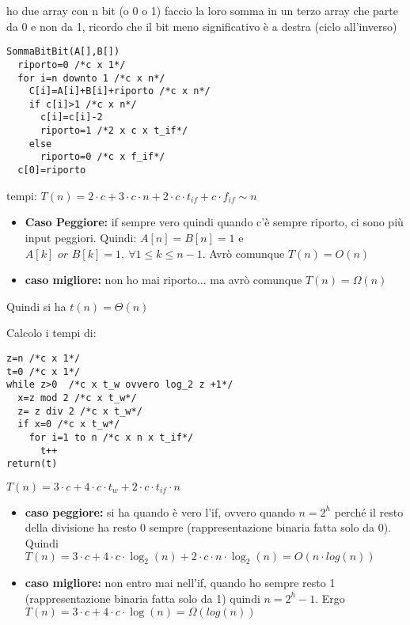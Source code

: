 \documentclass[a4paper,12pt,oneside,tikz]{book}
\begin{document}
\begin{esercizio}
ho due array con n bit (o 0 o 1) faccio la loro somma in un terzo array
che parte da 0 e non da 1, ricordo che il bit meno significativo è a  destra (ciclo all'inverso)
\begin{verbatim}
SommaBitBit(A[],B[])
  riporto=0 /*c x 1*/
  for i=n downto 1 /*c x n*/
    C[i]=A[i]+B[i]+riporto /*c x n*/
    if c[i]>1 /*c x n*/ 
      c[i]=c[i]-2
      riporto=1 /*2 x c x t_if*/
    else 
      riporto=0 /*c x f_if*/
  c[0]=riporto
\end{verbatim}
tempi: $T(n)=2\cdot c+3\cdot c\cdot n+ 2\cdot c\cdot t_{if}+c\cdot f_{if}\sim n$
\begin{itemize}
\item \textbf{Caso Peggiore:} if sempre vero quindi quando c'è sempre riporto, ci sono più input peggiori. Quindi: $A[n]=B[n]=1$ e  $A[k] \,\, or\,\, B[k]=1,\ \forall 1\leq k\leq n-1$. Avrò comunque $T(n)=O(n)$
\item \textbf{caso migliore:} non ho mai riporto... ma avrò comunque $T(n)=\Omega(n)$
\end{itemize}
Quindi si ha $t(n)=\Theta(n)$
\end{esercizio}
\begin{esercizio}
Calcolo i tempi di:
\begin{verbatim}
z=n /*c x 1*/
t=0 /*c x 1*/
while z>0  /*c x t_w ovvero log_2 z +1*/
  x=z mod 2 /*c x t_w*/
  z= z div 2 /*c x t_w*/
  if x=0 /*c x t_w*/
    for i=1 to n /*c x n x t_if*/
      t++
return(t)
\end{verbatim}
$T(n)=3\cdot c+4\cdot c\cdot t_{w}+2\cdot c\cdot t_{if}\cdot n$
\begin{itemize}
\item \textbf{caso peggiore:} si ha quando è vero l'if, ovvero quando $n=2^h$ perché il resto della divisione ha resto 0 sempre (rappresentazione binaria fatta solo da 0). Quindi $T(n)=3\cdot c+4\cdot c\cdot \log_2 (n) +2\cdot c\cdot n\cdot \log_2(n)=O(n\cdot log (n))$
\item \textbf{caso migliore:} non entro mai nell'if, quando ho sempre resto 1 (rappresentazione binaria fatta solo da 1) quindi $n=2^h-1$. Ergo $T(n)=3\cdot c+4\cdot c\cdot \log (n)=\Omega( log (n))$
\end{itemize}
\end{esercizio}
\end{document}

